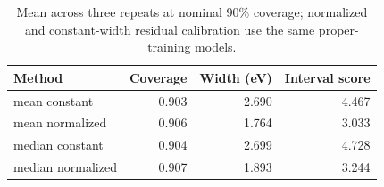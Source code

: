 \begin{table}[htbp]\centering\small
\caption{Mean across three repeats at nominal 90\% coverage; normalized and constant-width residual calibration use the same proper-training models.}
\begin{tabular}{lrrr}
\toprule
Method & Coverage & Width (eV) & Interval score \\
\midrule
mean constant & 0.903 & 2.690 & 4.467 \\
mean normalized & 0.906 & 1.764 & 3.033 \\
median constant & 0.904 & 2.699 & 4.728 \\
median normalized & 0.907 & 1.893 & 3.244 \\
\bottomrule
\end{tabular}\end{table}
